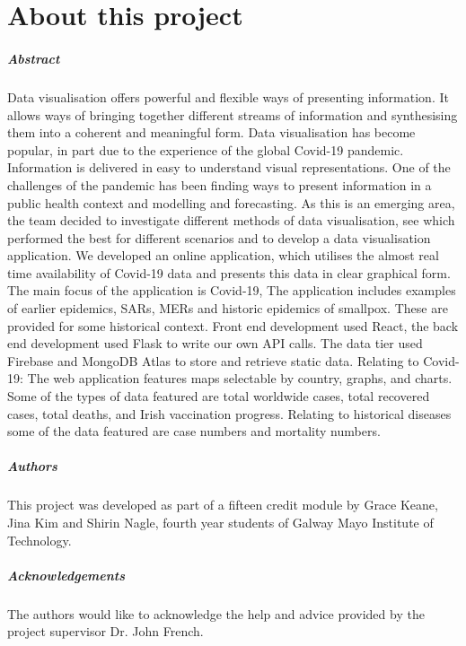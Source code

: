 
\chapter*{About this project}
\paragraph{Abstract}
Data visualisation offers powerful and flexible ways of presenting information. It allows ways of bringing together different streams of information and synthesising them into a coherent and meaningful form. Data visualisation has become popular, in part due to the experience of the global Covid-19 pandemic. Information is delivered in easy to understand visual representations. One of the challenges of the pandemic has been finding ways to present information in a public health context and modelling and forecasting.
As this is an emerging area, the team decided to investigate different methods of data visualisation, see which performed the best for different scenarios and to develop a data visualisation application. We developed an online application, which utilises the almost real time availability of Covid-19 data and presents this data in clear graphical form.
The main focus of the application is Covid-19, The application includes examples of earlier epidemics, SARs, MERs and historic epidemics of smallpox. These are provided for some historical context. Front end development used React, the back end development used Flask to write our own API calls. The data tier used Firebase and MongoDB Atlas to store and retrieve static data. Relating to Covid-19: The web application features maps selectable by country, graphs, and charts. Some of the types of data featured are total worldwide cases, total recovered cases, total deaths, and Irish vaccination progress. Relating to historical diseases some of the data featured are case numbers and mortality numbers.

\paragraph{Authors}
This project was developed as part of a fifteen credit module by Grace Keane, Jina Kim and Shirin Nagle, fourth year students of Galway Mayo Institute of Technology.

\paragraph{Acknowledgements} The authors would like to acknowledge the help and advice provided by the project supervisor Dr. John French.


